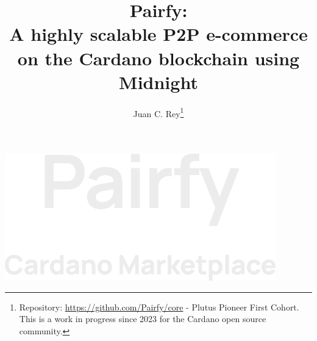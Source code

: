 \documentclass[12pt]{article}
\begin{document}
\newpage

\pagecolor{blueColor}

\begin{titlepage}
    \centering

     \includegraphics[width=0.88\textwidth, keepaspectratio]{latex-cover.png}
    
\end{titlepage}

\newpage

\pagecolor{white}

\renewenvironment{abstract}
 {\small
  \begin{center}
  \bfseries \abstractname\vspace{-.5em}\vspace{0pt}
  \end{center}
  \list{}{
    \setlength{\leftmargin}{.5cm}
    \setlength{\rightmargin}{\leftmargin}
  }
  \item\relax}
 {\endlist}
 

\title{\textbf{Pairfy:\\A highly scalable P2P e-commerce on the Cardano blockchain using Midnight }}

\author{Juan C. Rey\footnote{Repository: \url{https://github.com/Pairfy/core} - Plutus Pioneer First Cohort. This is a work in progress since 2023 for the Cardano open source community.  }\\} 

\maketitle

\renewcommand*\abstractname{\textbf{}\hfill}
\end{document}
